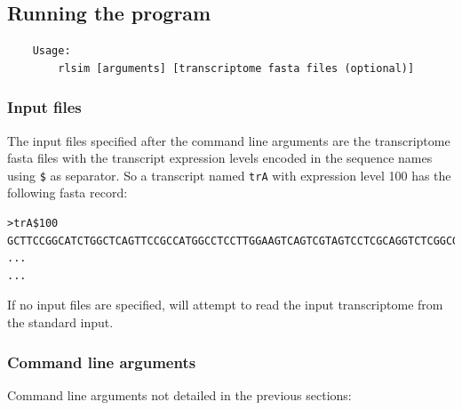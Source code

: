 \subsection{Running the program}

\begin{verbatim}
    Usage:
        rlsim [arguments] [transcriptome fasta files (optional)]
\end{verbatim}

\subsubsection{Input files}

The input files specified after the command line arguments are the transcriptome fasta files with the transcript expression levels
encoded in the sequence names using \texttt{\$} as separator. So a transcript named \texttt{trA} with expression level 100 has the following fasta record:

\begin{verbatim}
>trA$100
GCTTCCGGCATCTGGCTCAGTTCCGCCATGGCCTCCTTGGAAGTCAGTCGTAGTCCTCGCAGGTCTCGGCGGGAGCTG ...
...
\end{verbatim}

If no input files are specified, \rlsim will attempt to read the input transcriptome from the standard input.

\subsubsection{Command line arguments}

Command line arguments not detailed in the previous sections:

